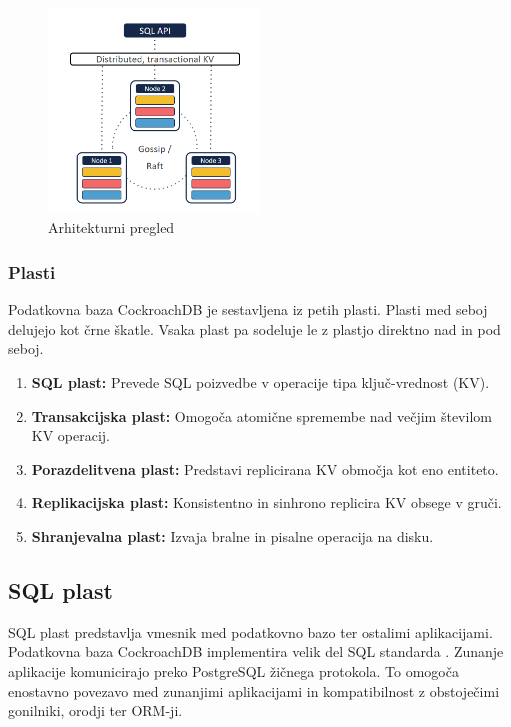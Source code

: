 \documentclass[a4paper, 12pt]{book}
\begin{document}
\begin{figure}[H]
\begin{center}
\includegraphics[width=0.5\textwidth]{resources/crdb-arhitecture-overview.png}
\end{center}
\caption{Arhitekturni pregled \cite{CRDB-2017}}
\label{img_crdb_arhitecture_overview}
\end{figure}

\subsubsection{Plasti}
Podatkovna baza CockroachDB je sestavljena iz petih plasti. Plasti med seboj delujejo kot črne škatle. Vsaka plast pa sodeluje le z plastjo direktno nad in pod seboj.

\begin{enumerate}
    \item \textbf{SQL plast:} Prevede SQL poizvedbe v operacije tipa ključ-vrednost (KV).
    \item \textbf{Transakcijska plast:} Omogoča atomične spremembe nad večjim šte\-vi\-lom KV operacij.
    \item \textbf{Porazdelitvena plast:} Predstavi replicirana KV območja kot eno entiteto.
    \item \textbf{Replikacijska plast:} Konsistentno in sinhrono replicira KV obsege v gruči.
    \item \textbf{Shranjevalna plast:} Izvaja bralne in pisalne operacija na disku.
\end{enumerate}

\subsection{SQL plast}

SQL plast predstavlja vmesnik med podatkovno bazo ter ostalimi aplikacijami.  Podatkovna baza CockroachDB implementira velik del SQL standarda \cite{CRDB-sql-standard}. Zunanje aplikacije komunicirajo preko PostgreSQL žičnega protokola. To omogoča enostavno povezavo med zunanjimi aplikacijami in kompatibilnost z obstoječimi gonilniki, orodji ter ORM-ji.
\end{document}
